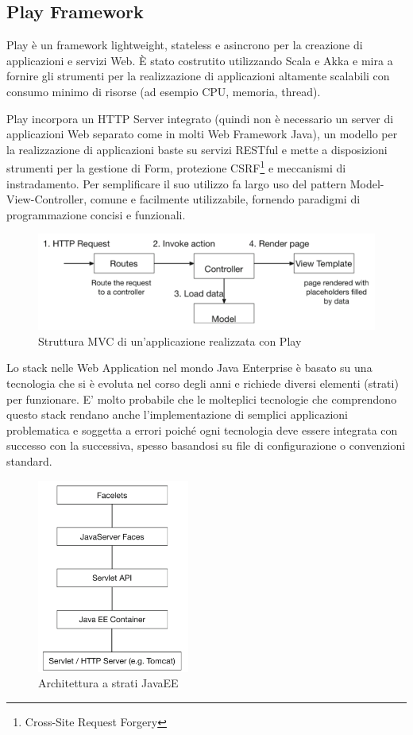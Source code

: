 \subsection{Play Framework} \label{play}
Play è un framework lightweight, stateless e asincrono per la creazione di applicazioni e servizi Web. È stato costrutito utilizzando Scala e Akka e mira a fornire gli strumenti per la realizzazione di applicazioni altamente scalabili con consumo minimo di risorse (ad esempio CPU, memoria, thread).\cite{play-framework}

\medskip

Play incorpora un HTTP Server integrato (quindi non è necessario un server di applicazioni Web separato come in molti Web Framework Java), un modello per la realizzazione di applicazioni baste su servizi RESTful e mette a disposizioni strumenti per la gestione di Form, protezione CSRF\footnote{Cross-Site Request Forgery} e meccanismi di instradamento. Per semplificare il suo utilizzo fa largo uso del pattern Model-View-Controller, comune e facilmente utilizzabile, fornendo paradigmi di programmazione concisi e funzionali.

\begin{figure}[H]
\centering
\includegraphics[width=\textwidth]{figures/Play_structure.png}
\caption{Struttura MVC di un'applicazione realizzata con Play\cite{play_framework_book}}
\end{figure}

Lo stack nelle Web Application nel mondo Java Enterprise è basato su una tecnologia che si è evoluta nel corso degli anni e richiede diversi elementi (strati) per funzionare. E' molto probabile che le molteplici tecnologie che comprendono questo stack rendano anche l'implementazione di semplici applicazioni problematica e soggetta a errori poiché ogni tecnologia deve essere integrata con successo con la successiva, spesso basandosi su file di configurazione o convenzioni standard.\cite{play_framework_book}

\begin{figure}[H]
\centering
\includegraphics[width=5cm]{figures/Java_EE_layered_architecture.png}
\caption{Architettura a strati JavaEE\cite{play_framework_book}}
\end{figure}

